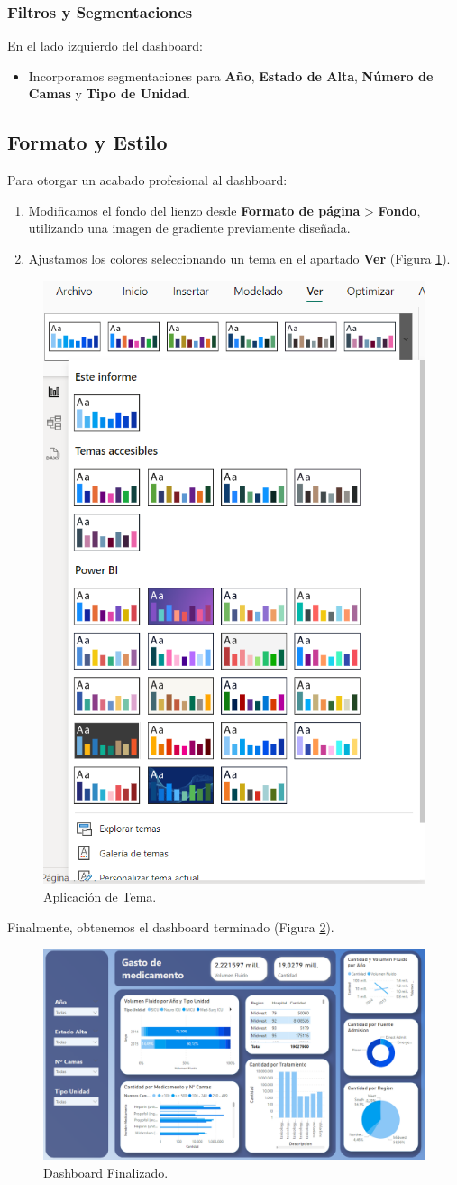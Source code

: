 \documentclass{article}
\begin{document}
\subsubsection{Filtros y Segmentaciones}
En el lado izquierdo del dashboard:
\begin{itemize}
	\item Incorporamos segmentaciones para \textbf{Año}, \textbf{Estado de Alta}, \textbf{Número de Camas} y \textbf{Tipo de Unidad}.
\end{itemize}

\subsection{Formato y Estilo}
Para otorgar un acabado profesional al dashboard:
\begin{enumerate}
	\item Modificamos el fondo del lienzo desde \textbf{Formato de página} > \textbf{Fondo}, utilizando una imagen de gradiente previamente diseñada.
	\item Ajustamos los colores seleccionando un tema en el apartado \textbf{Ver} (Figura \ref{fig:temas}).
\end{enumerate}

\begin{figure}[H]
	\centering
	\includegraphics[width=.3\textwidth]{images/temas.png}
	\caption{Aplicación de Tema.}
	\label{fig:temas}
\end{figure}

Finalmente, obtenemos el dashboard terminado (Figura \ref{fig:dashboard}).

\begin{figure}[H]
	\centering
	\includegraphics[width=\textwidth]{images/dashboard.png}
	\caption{Dashboard Finalizado.}
	\label{fig:dashboard}
\end{figure}
\end{document}
